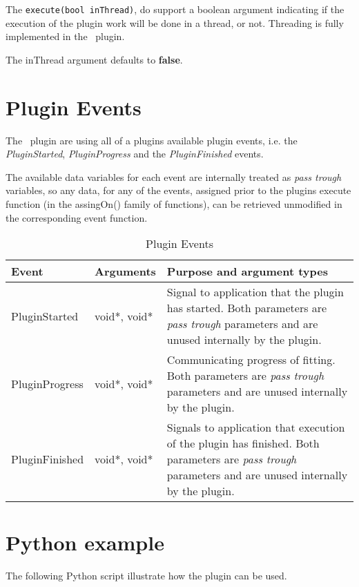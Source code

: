 The \verb|execute(bool inThread)|, do support a boolean argument indicating if the execution of the plugin work will be done in a thread, or not. Threading is fully implemented in the \pname\ plugin.

The inThread argument defaults to \textbf{false}.


\section{Plugin Events}
The \pname\ plugin are using all of a plugins available plugin events, i.e. the \emph{PluginStarted}, \emph{PluginProgress} and the \emph{PluginFinished} events.

The available data variables for each event are internally treated as \emph{pass trough} variables, so any data, for any of the events, assigned prior to 
the plugins execute function (in the assingOn() family of functions), can be retrieved unmodified in the corresponding event function.

\begin{table}[ht]
\centering %
\begin{tabular}{l l p{9cm}} 

Event & Arguments & Purpose and argument types \\ [0.5ex] %
\hline %
PluginStarted  	& 	void*, void*  & Signal to application that the plugin has started. Both parameters are \emph{pass trough} parameters and are unused internally by the plugin.\\[0.5ex]
PluginProgress	& 	void*, void*  & Communicating progress of fitting. Both parameters are \emph{pass trough} parameters and are unused internally by the plugin. \\[0.5ex]
PluginFinished	& 	void*, void*  & Signals to application that execution of the plugin has finished. Both parameters are \emph{pass trough} parameters and are unused internally by the plugin.\\

\hline %
\end{tabular}
\caption{Plugin Events} 
\label{table:MCPluginEvents} 
\end{table}

\section{Python example}
The following Python script illustrate how the plugin can be used. 

